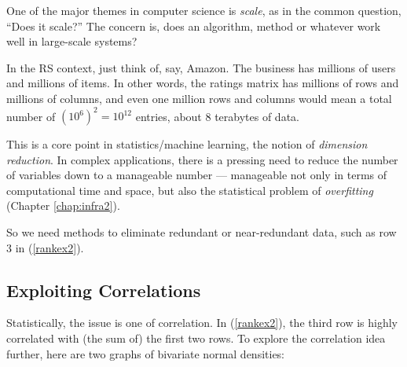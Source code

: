 One of the major themes in computer science is \textit{scale}, as in the
common question, ``Does it scale?''  The concern is, does an algorithm,
method or whatever work well in large-scale systems?

In the RS context, just think of, say, Amazon.  The business has
millions of users and millions of items.  In other words, the ratings
matrix has millions of rows and millions of columns, and even one
million rows and columns would mean a total number of $(10^6)^2 =
10^{12}$ entries, about 8 terabytes of data.

This is a core point in statistics/machine learning, the notion of
\textit{dimension reduction}.  In complex applications, there is a
pressing need to reduce the number of variables down to a 
manageable number --- manageable not only in terms of computational time
and space, but also the statistical problem of \textit{overfitting}
(Chapter \ref{chap:infra2}).

So we need methods to eliminate redundant or near-redundant data, such
as row 3 in (\ref{rankex2}).

\subsection{Exploiting Correlations}

Statistically, the issue is one of correlation.  In (\ref{rankex2}), the
third row is highly correlated with (the sum of) the first two rows.  To
explore the correlation idea further, here are two graphs of bivariate
normal densities:

